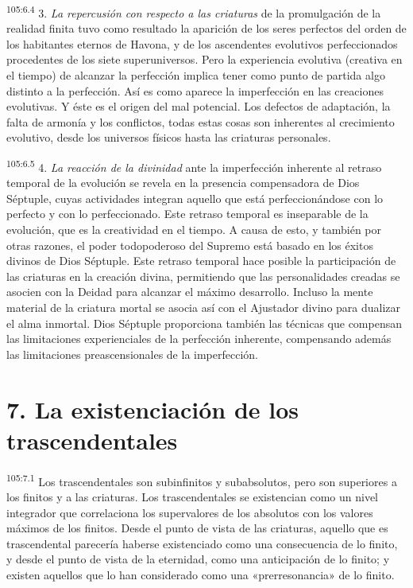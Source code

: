 \par
\textsuperscript{105:6.4} 3. \textit{La repercusión con respecto a las criaturas} de la promulgación de la realidad finita tuvo como resultado la aparición de los seres perfectos del orden de los habitantes eternos de Havona, y de los ascendentes evolutivos perfeccionados procedentes de los siete superuniversos. Pero la experiencia evolutiva (creativa en el tiempo) de alcanzar la perfección implica tener como punto de partida algo distinto a la perfección. Así es como aparece la imperfección en las creaciones evolutivas. Y éste es el origen del mal potencial. Los defectos de adaptación, la falta de armonía y los conflictos, todas estas cosas son inherentes al crecimiento evolutivo, desde los universos físicos hasta las criaturas personales.

\par
\textsuperscript{105:6.5} 4. \textit{La reacción de la divinidad} ante la imperfección inherente al retraso temporal de la evolución se revela en la presencia compensadora de Dios Séptuple, cuyas actividades integran aquello que está perfeccionándose con lo perfecto y con lo perfeccionado. Este retraso temporal es inseparable de la evolución, que es la creatividad en el tiempo. A causa de esto, y también por otras razones, el poder todopoderoso del Supremo está basado en los éxitos divinos de Dios Séptuple. Este retraso temporal hace posible la participación de las criaturas en la creación divina, permitiendo que las personalidades creadas se asocien con la Deidad para alcanzar el máximo desarrollo. Incluso la mente material de la criatura mortal se asocia así con el Ajustador divino para dualizar el alma inmortal. Dios Séptuple proporciona también las técnicas que compensan las limitaciones experienciales de la perfección inherente, compensando además las limitaciones preascensionales de la imperfección.

\section*{7. La existenciación de los trascendentales}
\par
\textsuperscript{105:7.1} Los trascendentales son subinfinitos y subabsolutos, pero son superiores a los finitos y a las criaturas. Los trascendentales se existencian como un nivel integrador que correlaciona los supervalores de los absolutos con los valores máximos de los finitos. Desde el punto de vista de las criaturas, aquello que es trascendental parecería haberse existenciado como una consecuencia de lo finito, y desde el punto de vista de la eternidad, como una anticipación de lo finito; y existen aquellos que lo han considerado como una «prerresonancia» de lo finito.

